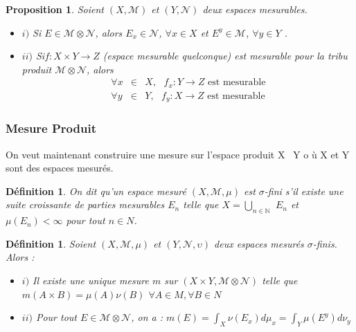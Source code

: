 \documentclass[3pt]{article}
\newtheorem{definition}[theorem]{D\'{e}finition}
\newtheorem{proposition}[theorem]{Proposition}
\begin{document}
\begin{proposition}
Soient $(X,\mathcal{M})$ et $(Y,\mathcal{N})$ deux espaces mesurables.

\begin{itemize}
\item $i)$ Si $E\in \mathcal{M}\otimes \mathcal{N}$, alors $E_{x}\in 
\mathcal{N}$, $\forall x\in X$ et $E^{y}\in \mathcal{M}$, $\forall y\in Y$ .

\item $ii)$ Si$f:X\times Y\rightarrow Z$ (espace mesurable quelconque) est
mesurable pour la tribu produit $\mathcal{M}\otimes \mathcal{N}$, alors%
\begin{eqnarray*}
\forall x &\in &X,\text{ }f_{x}:Y\rightarrow Z\text{ est mesurable} \\
\forall y &\in &Y,\text{ }f_{y}:X\rightarrow Z\text{ est mesurable}
\end{eqnarray*}
\end{itemize}
\end{proposition}

\subsubsection{Mesure Produit}

On veut maintenant construire une mesure sur l'espace produit X \times\ Y o%
\`{u} X et Y sont des espaces mesur\'{e}s.

\bigskip

\begin{definition}
On dit qu'un espace mesur\'{e} $(X,\mathcal{M},\mu )$ est $\sigma $-fini
s'il existe une suite croissante de parties mesurables $E_{n}$ telle que $%
X=\bigcup_{n\in \mathbb{N}}$ $E_{n}$ et $\mu (E_{n})<\infty $ pour tout $%
n\in N$.
\end{definition}

\bigskip

\begin{definition}
Soient $(X,\mathcal{M},\mu )$ et $(Y,\mathcal{N},\upsilon )$ deux espaces
mesur\'{e}s $\sigma $-finis. Alors :

\begin{itemize}
\item $i)$ Il existe une unique mesure $m$ sur $(X\times Y,\mathcal{M}%
\otimes \mathcal{N})$ telle que $m(A\times B)=\mu (A)\nu (B)$ $\forall A\in
M,\forall B\in N$

\item $ii)$ Pour tout $E\in \mathcal{M}\otimes \mathcal{N}$, on a : $%
m(E)=\int_{X}\nu (E_{x})d\mu _{x}=\int_{Y}\mu (E^{y})d\nu _{y}$
\end{itemize}
\end{definition}
\end{document}
